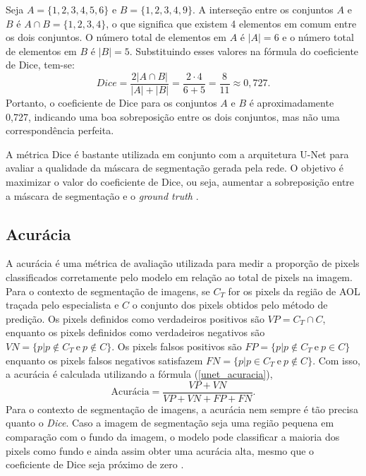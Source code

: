 \begin{exemplo}
    Seja $A = \{1,2,3,4,5,6\}$ e $B = \{1,2,3,4,9\}$. A interseção entre os conjuntos $A$ e $B$ é $A \cap B = \{1,2,3,4\}$, o que significa que existem 4 elementos em comum entre os dois conjuntos. O número total de elementos em $A$ é $|A| = 6$ e o número total de elementos em $B$ é $|B| = 5$. Substituindo esses valores na fórmula do coeficiente de Dice, tem-se:
$$
Dice = \frac{2|A \cap B|}{|A| + |B|} = \frac{2 \cdot 4}{6 + 5} = \frac{8}{11} \approx 0,727.
$$
Portanto, o coeficiente de Dice para os conjuntos $A$ e $B$ é aproximadamente 0,727, indicando uma boa sobreposição entre os dois conjuntos, mas não uma correspondência perfeita.
\end{exemplo}
A métrica Dice é bastante utilizada em conjunto com a arquitetura U-Net para avaliar a qualidade da máscara de segmentação gerada pela rede. O objetivo é maximizar o valor do coeficiente de Dice, ou seja, aumentar a sobreposição entre a máscara de segmentação e o \textit{ground truth} \cite{JadersonMelo2022UNetpp}.

\subsection{Acurácia}

A acurácia é uma métrica de avaliação utilizada para medir a proporção de pixels classificados corretamente pelo modelo em relação ao total de pixels na imagem. Para o contexto de segmentação de imagens, se $C_T$ for os pixels da região de AOL traçada pelo especialista e $C$ o conjunto dos pixels obtidos pelo método de predição. Os pixels definidos como verdadeiros positivos são $VP = C_T \cap C$, enquanto os pixels definidos como verdadeiros negativos são $VN = \{p|p \notin C_T \ \text{e} \ p \notin C\}$. Os pixels falsos positivos são $FP = \{p|p \notin C_T \ \text{e} \ p \in C\}$ enquanto os pixels falsos negativos satisfazem $FN = \{p|p \in C_T \ \text{e} \ p \notin C\}$. Com isso, a acurácia é calculada utilizando a fórmula (\ref{unet_acuracia}),
\begin{equation}
    \label{unet_acuracia}
    \text{Acurácia} = \frac{VP + VN}{VP + VN + FP + FN}.
\end{equation}
Para o contexto de segmentação de imagens, a acurácia nem sempre é tão precisa quanto o \textit{Dice}. Caso a imagem de segmentação seja uma região pequena em comparação com o fundo da imagem, o modelo pode classificar a maioria dos pixels como fundo e ainda assim obter uma acurácia alta, mesmo que o coeficiente de Dice seja próximo de zero \cite{JadersonMelo2022UNetpp}.


